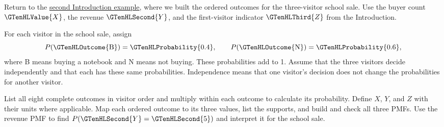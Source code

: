 Return to the \hyperref[subsec:t2-c1-independent-outcomes]{second Introduction example}, where we built the ordered outcomes for the three-visitor school sale. Use the buyer count $\GTenHLValue{X}$, the revenue $\GTenHLSecond{Y}$, and the first-visitor indicator $\GTenHLThird{Z}$ from the Introduction.

For each visitor in the school sale, assign
\[
P(\GTenHLOutcome{\mathrm{B}})=\GTenHLProbability{0.4},\qquad P(\GTenHLOutcome{\mathrm{N}})=\GTenHLProbability{0.6},
\]
where B means buying a notebook and N means not buying. These probabilities add to 1. Assume that the three visitors decide independently and that each has these same probabilities. Independence means that one visitor's decision does not change the probabilities for another visitor.

    {List all eight complete outcomes in visitor order and multiply within each outcome to calculate its probability.}
    {Define $X$, $Y$, and $Z$ with their units where applicable. Map each ordered outcome to its three values, list the supports, and build and check all three PMFs.}
    {Use the revenue PMF to find $P(\GTenHLSecond{Y}=\GTenHLSecond{5})$ and interpret it for the school sale.}

